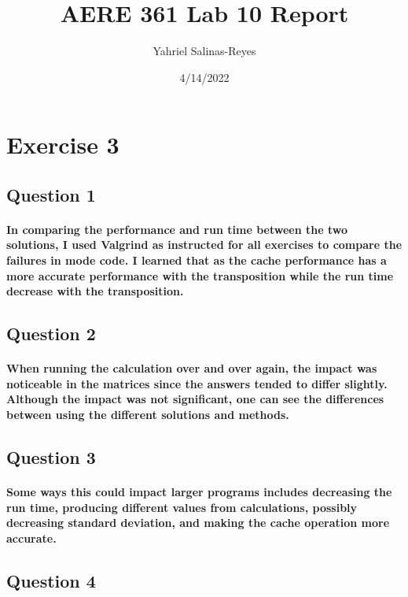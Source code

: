 \documentclass{article}
\title{AERE 361 Lab 10 Report}
\author{Yahriel Salinas-Reyes}
\date{4/14/2022}
\begin{document}
\maketitle

\newpage

\section{Exercise 3}


\subsection{Question 1}

    \paragraph{In comparing the performance and run time between the two solutions, I used Valgrind as instructed for all exercises to compare the failures in mode code. I learned that as the cache performance has a more accurate performance with the transposition while the run time decrease with the transposition.}


\subsection{Question 2}

    \paragraph{When running the calculation over and over again, the impact was noticeable in the matrices since the answers tended to differ slightly. Although the impact was not significant, one can see the differences between using the different solutions and methods.}


\subsection{Question 3}

    \paragraph{Some ways this could impact larger programs includes decreasing the run time, producing different values from calculations, possibly decreasing standard deviation, and making the cache operation more accurate.}


\subsection{Question 4}
\end{document}

